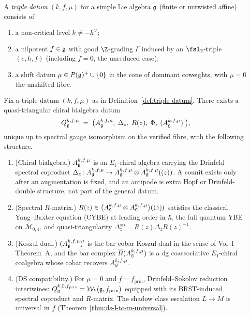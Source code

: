 \begin{definition}
\label{def:triple-datum}
A \emph{triple datum} $(k,f,\mu)$ for a simple Lie algebra
$\mathfrak{g}$ (finite or untwisted affine) consists of
\begin{enumerate}[label=\textup{(\roman*)}]
\item a non-critical level $k\ne -h^\vee$;
\item a nilpotent $f\in\mathfrak{g}$ with good $\Z$-grading $\Gamma$ induced
 by an $\fsl_2$-triple $(e,h,f)$ (including $f=0$, the unreduced
 case);
\item a shift datum $\mu\in P(\mathfrak{g})^+\cup\{0\}$ in the cone of dominant
 coweights, with $\mu=0$ the unshifted fibre.
\end{enumerate}
\end{definition}

\begin{theorem}
\label{thm:gravitational-yangian-unified-chiral-quantum-group}
Fix a triple datum $(k,f,\mu)$ as in
Definition~\ref{def:triple-datum}. There exists a quasi-triangular
chiral bialgebra datum
\begin{equation}\label{eq:unified-Q}
Q_{\mathfrak{g}}^{k,f,\mu}
\;=\;\bigl(
A_{\mathfrak{g}}^{k,f,\mu},\;\Delta_z,\;R(z),\;\Phi,\;
(A_{\mathfrak{g}}^{k,f,\mu})^!\bigr),
\end{equation}
unique up to spectral gauge isomorphism on the verified fibre, with
the following structure.
\begin{enumerate}[label=\textup{(\roman*)}]
\item \textup{(Chiral bialgebra.)}
 $A_{\mathfrak{g}}^{k,f,\mu}$ is an $E_1$-chiral algebra carrying the
 Drinfeld spectral coproduct
 $\Delta_z\colon A_{\mathfrak{g}}^{k,f,\mu}\to A_{\mathfrak{g}}^{k,f,\mu}\otimes
 A_{\mathfrak{g}}^{k,f,\mu}((z))$. A counit exists only after an augmentation
 is fixed, and an antipode is extra Hopf or Drinfeld-double
 structure, not part of the general datum.
\item \textup{(Spectral $R$-matrix.)}
 $R(z)\in \bigl(A_{\mathfrak{g}}^{k,f,\mu}\otimes A_{\mathfrak{g}}^{k,f,\mu}\bigr)((z))$
 satisfies the classical Yang--Baxter equation (CYBE) at leading
 order in $\hbar$, the full quantum YBE on
 $\overline{\mathcal{M}}_{0,4}$, and quasi-triangularity
 $\Delta_z^{\mathrm{op}}=R(z)\Delta_z R(z)^{-1}$.
\item \textup{(Koszul dual.)}
 $(A_{\mathfrak{g}}^{k,f,\mu})^!$ is the bar-cobar Koszul dual in the sense of
 Vol~I Theorem~A, and the bar complex
 $\overline{B}(A_{\mathfrak{g}}^{k,f,\mu})$ is a dg coassociative
 $E_1$-chiral coalgebra whose cobar recovers $A_{\mathfrak{g}}^{k,f,\mu}$.
\item \textup{(DS compatibility.)}
 For $\mu=0$ and $f=f_{\mathrm{prin}}$, Drinfeld--Sokolov reduction
 intertwines:
 $Q_{\mathfrak{g}}^{k,0,f_{\mathrm{prin}}}
 = \mathcal{W}_k(\mathfrak{g},f_{\mathrm{prin}})$ equipped with its
 BRST-induced spectral coproduct and $R$-matrix.
 The shadow class escalation $L\to M$ is universal in $f$
 \textup{(}Theorem~\ref{thm:ds-l-to-m-universal}\textup{)}.
\end{enumerate}
\end{theorem}

